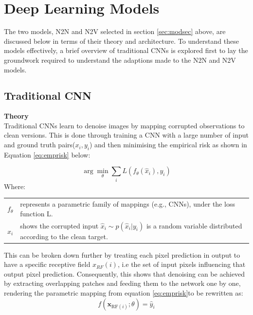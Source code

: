 \section{Deep Learning Models}
The two models, \gls{N2N} and \gls{N2V} selected in section \ref{sec:modsec} above, are discussed below in terms of their theory and architecture. To understand these models effectively, a brief overview of traditional \gls{CNN}s is explored first to lay the groundwork required to understand the adaptions made to the \gls{N2N} and \gls{N2V} models.


\subsection{Traditional \gls{CNN}}
\textbf{Theory}\\
Traditional \gls{CNN}s learn to denoise images by mapping corrupted observations to clean versions.  This is done through training a \gls{CNN} with a large number of input and ground truth pairs($x_i,y_i$) and then minimising the empirical risk as shown in Equation \ref{eq:emprisk} below:

\begin{equation}
	\arg\min_{\theta} \sum_{i} L\left( f_{\theta}(\hat{x}_i), y_i \right)
	\label{eq:emprisk}
\end{equation}
Where:
\begin{table}[h!]
\begin{tabular}{ll}
	$f_{\theta}$ & represents a parametric family of mappings (e.g., \gls{CNN}s), under the loss function L.  \\
	$\hat{x}_i$ & shows the corrupted input $\hat{x}_i \sim p(\hat{x}_i | y_i)$  is a random variable distributed according to the clean target.\\
\end{tabular}
\end{table}

This can be broken down further by treating each pixel prediction in output to have a specific receptive field $x_{RF}(i)$, i.e the set of input pixels influencing that output pixel prediction. Consequently, this shows that denoising can be achieved by extracting overlapping patches and feeding them to the network one by one, rendering the parametric mapping from equation \ref{eq:emprisk}to be rewritten as:
\begin{equation}
	f({{\mathbf{x}}_{{\text{RF}}(i)}};\theta ) = {\hat y_i}
	\label{eq:parmap}
\end{equation}

